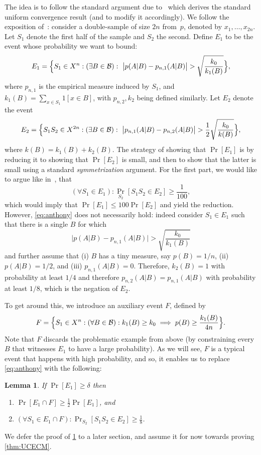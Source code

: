 \documentclass{article}
\newtheorem{lemma}[theorem]{Lemma}
\newcommand{\B}{{\cal B}}
\newcommand{\comment}[3]{\marginpar{\textcolor{#2}{#1: #3}}}
\newcommand{\yoav}[1]{\comment{Yoav}{blue}{#1}}
\begin{document}
The idea is to follow the standard argument due to~\cite{vapnik} 
which derives the standard uniform convergence result (and to modify it accordingly). 
We follow the exposition of~\cite{anthony}:
consider a double-sample of size $2n$ from~$p$, denoted by $x_1,\ldots,x_{2n}$.
Let $S_1$ denote the first half of the sample and $S_2$ the second.
Define $E_1$ to be the event whose probability we want to bound:
\[E_1 = \Bigl\{ S_1\in X^n : (\exists B\in \B):~ 
\bigl\lvert p(A \vert B) - p_{n,1}(A \vert B) \bigr\rvert > 
\sqrt{\frac{k_0}{k_{1}(B)}} \Bigr\},\]
where $p_{n,1}$ is the empirical measure induced by $S_1$, 
and $k_{1}(B)=\sum_{x \in S_1} 1[x \in B]$, 
with $p_{n,2}, k_{2}$ being defined similarly.
Let $E_2$ denote the event
\[E_2 = 
\Bigl\{
S_1S_2\in X^{2n} : (\exists B\in\B):~
\bigl\lvert p_{n,1}(A \vert B)   -  p_{n,2}(A \vert B) \bigr\rvert >  
{\frac{1}{2}}\sqrt{\frac{k_0}{k(B)}}
\Bigr\},
\]
where $k(B) = k_{1}(B)+k_{2}(B)$.
The strategy of showing that $\Pr[E_1]$ is by reducing it to showing that $\Pr[E_2]$ 
is small, and then to show that the latter is small using a standard \emph{symmetrization} argument. 
For the first part, we would like to argue like in~\cite{anthony}, that
\begin{equation}\label{eq:anthony} 
(\forall S_1\in E_1): \Pr_{S_2}[S_1S_2\in E_2]\geq \frac{1}{100},
\end{equation}
which would imply that $\Pr[E_1]\leq 100\Pr[E_2]$ and yield the reduction.
However, \eqref{eq:anthony} does not necessarily hold: indeed consider
$S_1\in E_1$ such that there is a single $B$ for which 
\[
\bigl\lvert p(A \vert B) - p_{n,1}(A \vert B) \bigr\rvert > 
\sqrt{\frac{k_0}{k_{1}(B)}}
\]
and further assume that 
(i) $B$ has a tiny measure, say $p(B) = 1/n$,
(ii) $p(A\vert B)= 1/2$, and
(iii) $p_{n,1}(A\vert B) = 0$.
Therefore, $k_2(B)=1$ with probability at least $1/4$
and therefore $p_{n,2}(A \vert B)=p_{n,1}(A \vert B)$
with probability at least $1/8$, which is the negation of $E_2$.

To get around this, we introduce an auxiliary event $F$, defined by
\[F = \Bigl\{S_1\in X^{n} : (\forall B\in\B): k_{1}(B) \geq k_0 \implies p(B)\geq \frac{k_{1}(B)}{4n}\Bigr\}. \]
\yoav{I find it more natural to define the complement of $F$, i.e. the
  set of samples for which there exists a ball where the bad thing happens.}
Note that $F$ discards the problematic example from above 
(by constraining every $B$ that witnesses $E_1$ to have a large probability). 
As we will see, $F$ is a typical event that happens with high probability,
and so, it enables us to replace \ref{eq:anthony} with the following:
\begin{lemma}\label{lem:reduction}
If $\Pr[E_1]\geq \delta$ then 
\begin{enumerate}
\item $\Pr[E_1\cap F] \geq \frac{1}{2}\Pr[E_1]$, and
\item $(\forall S_1\in E_1\cap F): \Pr_{S_2}[S_1S_2\in E_2] \geq \frac{1}{8}$. 
\end{enumerate}
\end{lemma}
We defer the proof of \ref{lem:reduction} to a later section, 
and assume it for now towards proving \ref{thm:UCECM}.
\end{document}
